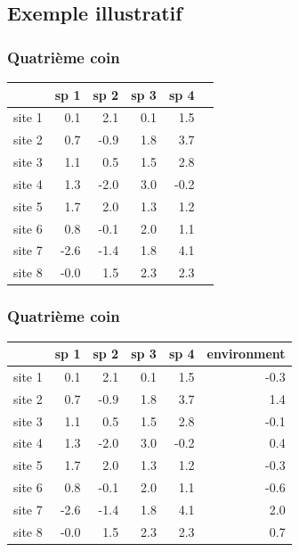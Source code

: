 \documentclass{beamer}
\numberwithin{exercise}{section}
\begin{document}
\subsection{Exemple illustratif}

\begin{frame}
\frametitle{Quatri\`{e}me coin}
\small
\begin{table}[ht]
\begin{center}
\begin{tabular}{r|rrrr|r|}
  & sp 1 & sp 2 & sp 3 & sp 4 \\ 
  \hline
site 1 & 0.1 & 2.1 & 0.1 & 1.5  \\ 
  site 2 & 0.7 & -0.9 & 1.8 & 3.7  \\ 
  site 3 & 1.1 & 0.5 & 1.5 & 2.8  \\ 
  site 4 & 1.3 & -2.0 & 3.0 & -0.2  \\ 
  site 5 & 1.7 & 2.0 & 1.3 & 1.2  \\ 
  site 6 & 0.8 & -0.1 & 2.0 & 1.1  \\ 
  site 7 & -2.6 & -1.4 & 1.8 & 4.1  \\ 
  site 8 & -0.0 & 1.5 & 2.3 & 2.3  \\ 
   \hline
\end{tabular}
\end{center}
\end{table}\normalsize
\end{frame}

\begin{frame}
\frametitle{Quatri\`{e}me coin}
\small
\begin{table}[ht]
\begin{center}
\begin{tabular}{r|rrrr|r|}
  & sp 1 & sp 2 & sp 3 & sp 4 & environment \\ 
  \hline
site 1 & 0.1 & 2.1 & 0.1 & 1.5 & -0.3 \\ 
  site 2 & 0.7 & -0.9 & 1.8 & 3.7 & 1.4 \\ 
  site 3 & 1.1 & 0.5 & 1.5 & 2.8 & -0.1 \\ 
  site 4 & 1.3 & -2.0 & 3.0 & -0.2 & 0.4 \\ 
  site 5 & 1.7 & 2.0 & 1.3 & 1.2 & -0.3 \\ 
  site 6 & 0.8 & -0.1 & 2.0 & 1.1 & -0.6 \\ 
  site 7 & -2.6 & -1.4 & 1.8 & 4.1 & 2.0 \\ 
  site 8 & -0.0 & 1.5 & 2.3 & 2.3 & 0.7 \\ 
   \hline
\end{tabular}
\end{center}
\end{table}\normalsize
\end{frame}
\end{document}
